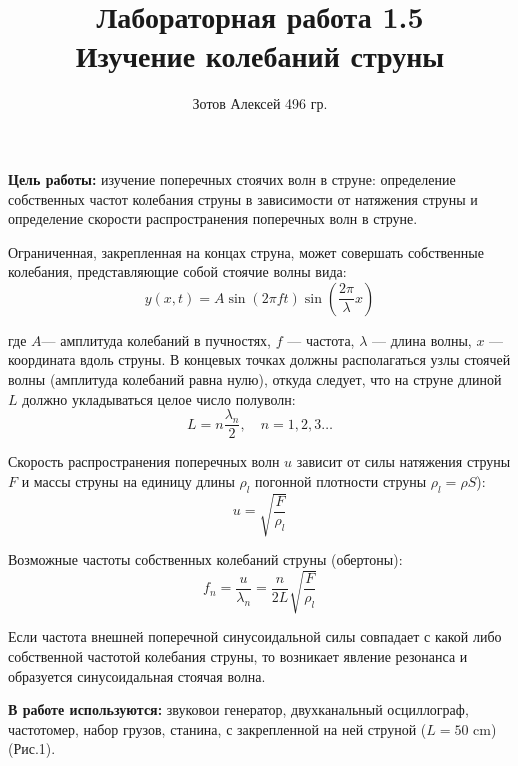 \documentclass[8pt]{article}
\begin{document}
    \author {Зотов Алексей 496 гр.}
    \title {Лабораторная работа 1.5 \\  Изучение колебаний струны}
    \maketitle{}   

    \textbf{Цель работы:} изучение поперечных стоячих волн в струне: определение собственных частот колебания струны в зависимости от натяжения струны и определение скорости распространения поперечных волн в струне. 

    Ограниченная, закрепленная на концах струна, может совершать собственные колебания, представляющие собой стоячие волны вида:
    \begin{equation}
        y(x,t) = A\sin \left (2 \pi f t \right )\sin \left(\frac{2\pi}{\lambda}x \right)
    \end{equation}

    где $A$— амплитуда колебаний в пучностях, $f$ — частота, $\lambda$ — длина волны, $x$ — координата вдоль струны. В концевых точках должны располагаться узлы стоячей волны (амплитуда колебаний равна нулю), откуда следует, что на струне длиной $L$ должно укладываться целое число полуволн:
    \begin{equation}
        L = n \frac{\lambda_n}{2}, \quad n = 1,2,3\dots        
    \end{equation}

    Скорость распространения поперечных волн $u$ зависит от силы натяжения струны $F$ и массы струны на единицу длины 
    $\rho _l$ погонной плотности струны $\rho _l  = \rho S$):
    \begin{equation}
        u = \sqrt{\frac{F}{\rho_l}}
    \end{equation}

    Возможные частоты собственных колебаний струны (обертоны):
    \begin{equation}
        f_n = \frac{u}{\lambda_n} = \frac{n}{2L}\sqrt{\frac{F}{\rho_l}} 
    \end{equation}

    Если частота внешней поперечной синусоидальной силы совпадает с какой либо собственной частотой колебания струны, то возникает явление резонанса и образуется синусоидальная стоячая волна.

    \textbf{В работе используются:} звуковои генератор, двухканальный осциллограф, частотомер, набор грузов, станина, с закрепленной на ней струной ($L = 50$ cm) (Рис.1).
\end{document}
